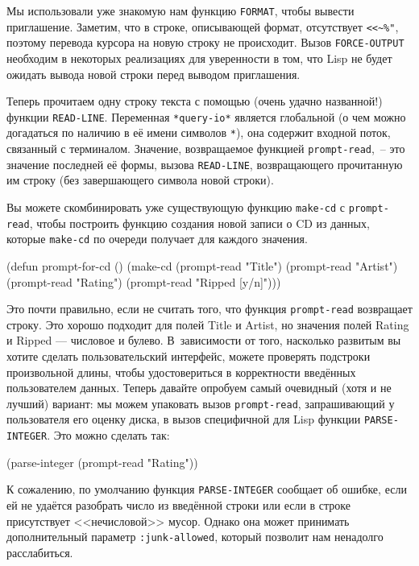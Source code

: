 Мы использовали уже знакомую нам функцию \lstinline{FORMAT}, чтобы вывести
приглашение. Заметим, что в строке, описывающей формат, отсутствует \lstinline{<<~%"},
поэтому перевода курсора на новую строку не происходит. Вызов \lstinline{FORCE-OUTPUT}
необходим в некоторых реализациях для уверенности в том, что Lisp не будет ожидать вывода
новой строки перед выводом приглашения.

Теперь прочитаем одну строку текста с помощью (очень удачно названной!) функции
\lstinline{READ-LINE}. Переменная \lstinline{*query-io*} является глобальной (о чем можно
догадаться по наличию в её имени символов \lstinline{*}), она содержит входной поток, связанный
с терминалом. Значение, возвращаемое функцией \lstinline{prompt-read},~-- это значение
последней её формы, вызова \lstinline{READ-LINE}, возвращающего прочитанную им строку (без
завершающего символа новой строки).

Вы можете скомбинировать уже существующую функцию \lstinline{make-cd} с \lstinline{prompt-read},
чтобы построить функцию создания новой записи о CD из данных, которые \lstinline{make-cd} по
очереди получает для каждого значения.

\begin{myverb}
(defun prompt-for-cd ()
 (make-cd
  (prompt-read "Title")
  (prompt-read "Artist")
  (prompt-read "Rating")
  (prompt-read "Ripped [y/n]")))
\end{myverb}

Это почти правильно, если не считать того, что функция \lstinline{prompt-read} возвращает
строку. Это хорошо подходит для полей Title и Artist, но значения полей Rating и Ripped
--- числовое и булево. В~зависимости от того, насколько развитым вы хотите сделать
пользовательский интерфейс, можете проверять подстроки произвольной длины, чтобы
удостовериться в корректности введённых пользователем данных. Теперь давайте опробуем
самый очевидный (хотя и не лучший) вариант: мы можем упаковать вызов \lstinline{prompt-read},
запрашивающий у пользователя его оценку диска, в вызов специфичной для Lisp функции
\lstinline{PARSE-INTEGER}. Это можно сделать так:

\begin{myverb}
(parse-integer (prompt-read "Rating"))
\end{myverb}

К сожалению, по умолчанию функция \lstinline{PARSE-INTEGER} сообщает об ошибке, если ей не
удаётся разобрать число из введённой строки или если в строке присутствует <<нечисловой>>
мусор. Однако она может принимать дополнительный параметр \lstinline{:junk-allowed}, который позволит
нам ненадолго расслабиться.

